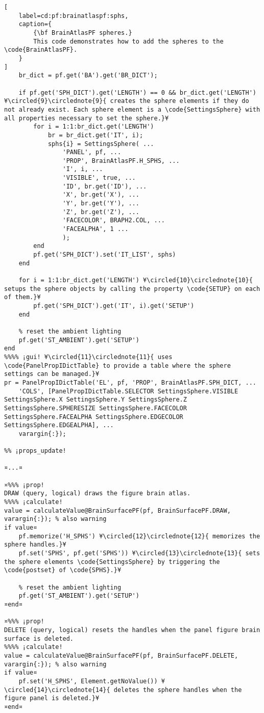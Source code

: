 \documentclass{tufte-handout}
\begin{document}
\begin{lstlisting}[
	label=cd:pf:brainatlaspf:sphs,
	caption={
		{\bf BrainAtlasPF spheres.}
		This code demonstrates how to add the spheres to the \code{BrainAtlasPF}.
	}
]
    br_dict = pf.get('BA').get('BR_DICT');
    
    if pf.get('SPH_DICT').get('LENGTH') == 0 && br_dict.get('LENGTH') ¥\circled{9}\circlednote{9}{ creates the sphere elements if they do not already exist. Each sphere element is a \code{SettingsSphere} with all properties necessary to set the sphere.}¥
        for i = 1:1:br_dict.get('LENGTH')
            br = br_dict.get('IT', i);
            sphs{i} = SettingsSphere( ...
                'PANEL', pf, ...
                'PROP', BrainAtlasPF.H_SPHS, ...
                'I', i, ...
                'VISIBLE', true, ...
                'ID', br.get('ID'), ...
                'X', br.get('X'), ... 
                'Y', br.get('Y'), ...
                'Z', br.get('Z'), ...
                'FACECOLOR', BRAPH2.COL, ...
                'FACEALPHA', 1 ...
                );
        end
        pf.get('SPH_DICT').set('IT_LIST', sphs)
    end
    
    for i = 1:1:br_dict.get('LENGTH') ¥\circled{10}\circlednote{10}{ setups the sphere objects by calling the property \code{SETUP} on each of them.}¥
        pf.get('SPH_DICT').get('IT', i).get('SETUP')
    end
    
    % reset the ambient lighting
    pf.get('ST_AMBIENT').get('SETUP')
end
%%%% ¡gui! ¥\circled{11}\circlednote{11}{ uses \code{PanelPropIDictTable} to provide a table where the sphere settings can be managed.}¥
pr = PanelPropIDictTable('EL', pf, 'PROP', BrainAtlasPF.SPH_DICT, ...
    'COLS', [PanelPropIDictTable.SELECTOR SettingsSphere.VISIBLE SettingsSphere.X SettingsSphere.Y SettingsSphere.Z SettingsSphere.SPHERESIZE SettingsSphere.FACECOLOR SettingsSphere.FACEALPHA SettingsSphere.EDGECOLOR SettingsSphere.EDGEALPHA], ...
    varargin{:});

%% ¡props_update!

¤...¤

¤%%% ¡prop!
DRAW (query, logical) draws the figure brain atlas.
%%%% ¡calculate!
value = calculateValue@BrainSurfacePF(pf, BrainSurfacePF.DRAW, varargin{:}); % also warning
if value¤
    pf.memorize('H_SPHS') ¥\circled{12}\circlednote{12}{ memorizes the sphere handles.}¥
    pf.set('SPHS', pf.get('SPHS')) ¥\circled{13}\circlednote{13}{ sets the sphere elements \code{SettingsSphere} by triggering the \code{postset} of \code{SPHS}.}¥

    % reset the ambient lighting
    pf.get('ST_AMBIENT').get('SETUP')
¤end¤
    
¤%%% ¡prop!
DELETE (query, logical) resets the handles when the panel figure brain surface is deleted.
%%%% ¡calculate!
value = calculateValue@BrainSurfacePF(pf, BrainSurfacePF.DELETE, varargin{:}); % also warning
if value¤
    pf.set('H_SPHS', Element.getNoValue()) ¥\circled{14}\circlednote{14}{ deletes the sphere handles when the figure panel is deleted.}¥
¤end¤


\end{lstlisting}
\end{document}
